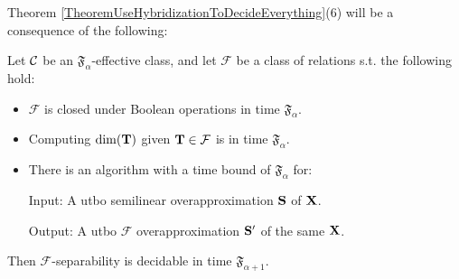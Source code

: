 Theorem \ref{TheoremUseHybridizationToDecideEverything}(6) will be a consequence of the following:

\begin{theorem} \label{TheoremDecidingSeparability}
Let \(\mathcal{C}\) be an \(\mathfrak{F}_{\alpha}\)-effective class, and let \(\mathcal{F}\) be a class of relations s.t. the following hold:
\begin{itemize}
\item \(\mathcal{F}\) is closed under Boolean operations in time \(\mathfrak{F}_{\alpha}\).
\item Computing \(\dim(\mathbf{T})\) given \(\mathbf{T} \in \mathcal{F}\) is in time \(\mathfrak{F}_{\alpha}\).
\item There is an algorithm with a time bound of \(\mathfrak{F}_{\alpha}\) for: 

Input: A utbo semilinear overapproximation \(\mathbf{S}\) of \(\mathbf{X}\).

Output: A utbo \(\mathcal{F}\) overapproximation \(\mathbf{S}'\) of the same \(\mathbf{X}\).
\end{itemize}
Then \(\mathcal{F}\)-separability is decidable in time \(\mathfrak{F}_{\alpha+1}\).
\end{theorem}


